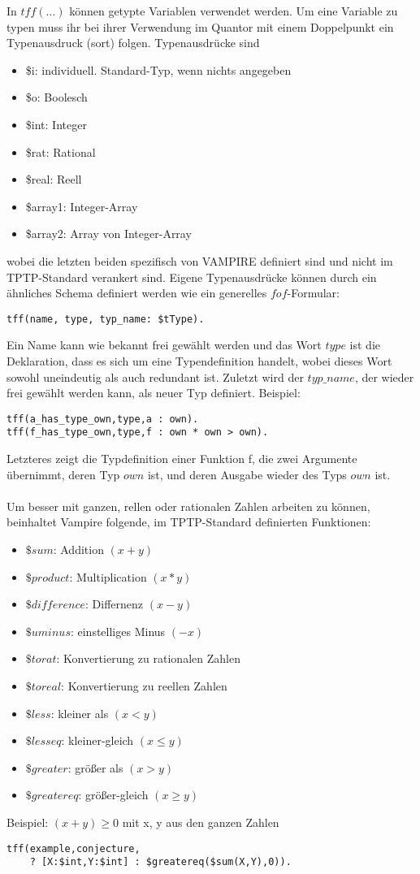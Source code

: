\documentclass{article}
\begin{document}
In $tff(\dots)$ können getypte Variablen verwendet werden. Um eine Variable zu typen muss ihr bei ihrer Verwendung im Quantor mit einem Doppelpunkt ein Typenausdruck (sort) folgen.
Typenausdrücke sind \begin{itemize}
	\item \$i: individuell. Standard-Typ, wenn nichts angegeben
	\item \$o: Boolesch
	\item \$int: Integer
	\item \$rat: Rational
	\item \$real: Reell
	\item \$array1: Integer-Array
	\item \$array2: Array von Integer-Array
\end{itemize}
wobei die letzten beiden spezifisch von VAMPIRE definiert sind und nicht im TPTP-Standard verankert sind.
Eigene Typenausdrücke können durch ein ähnliches Schema definiert werden wie ein generelles $fof$-Formular:
\begin{lstlisting}[language=tptp]
tff(name, type, typ_name: $tType).
\end{lstlisting}
Ein Name kann wie bekannt frei gewählt werden und das Wort $type$ ist die Deklaration, dass es sich um eine Typendefinition handelt, wobei dieses Wort sowohl uneindeutig als auch redundant ist.
Zuletzt wird der $typ\_name$, der wieder frei gewählt werden kann, als neuer Typ definiert. Beispiel:
\begin{lstlisting}[language=tptp]
tff(a_has_type_own,type,a : own).
tff(f_has_type_own,type,f : own * own > own).
\end{lstlisting}
Letzteres zeigt die Typdefinition einer Funktion f, die zwei Argumente übernimmt, deren Typ $own$ ist, und deren Ausgabe wieder des Typs $own$ ist.\\
\\
Um besser mit ganzen, rellen oder rationalen Zahlen arbeiten zu können, beinhaltet Vampire folgende, im TPTP-Standard definierten Funktionen:
\begin{itemize}
	\item $\$sum$: Addition $(x + y)$
	\item $\$product$: Multiplication $(x * y)$
	\item $\$difference$: Differnenz $(x - y)$
	\item $\$uminus$: einstelliges Minus $(-x)$
	\item $\$to rat$: Konvertierung zu rationalen Zahlen
	\item $\$to real$: Konvertierung zu reellen Zahlen
	\item $\$less$: kleiner als $(x < y)$
	\item $\$lesseq$: kleiner-gleich $(x \leq y)$
	\item $\$greater$: größer als $(x > y)$
	\item $\$greatereq$: größer-gleich $(x \geq y)$ 
\end{itemize}
Beispiel: $(x + y) \geq 0$ mit x, y aus den ganzen Zahlen
\begin{lstlisting}[language=tptp]
tff(example,conjecture, 
	? [X:$int,Y:$int] : $greatereq($sum(X,Y),0)).\end{lstlisting}
\end{document}
